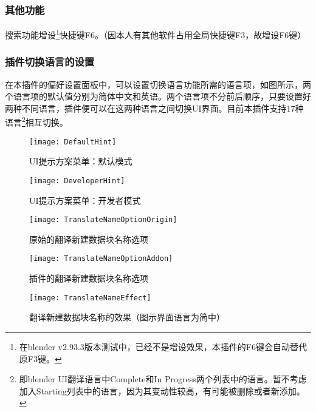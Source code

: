 \documentclass{../../PublicResources/DocClass}
\begin{document}
\subsubsection{其他功能}
搜索功能增设\footnote{在blender v2.93.3版本测试中，已经不是增设效果，本插件的F6键会自动替代原F3键。}快捷键F6。（因本人有其他软件占用全局快捷键F3，故增设F6键）

\subsubsection{插件切换语言的设置}
在本插件的偏好设置面板中，可以设置切换语言功能所需的语言项，如图所示，两个语言项的默认值分别为简体中文和英语。两个语言项不分前后顺序，只要设置好两种不同语言，插件便可以在这两种语言之间切换UI界面。目前本插件支持17种语言\footnote{即blender UI翻译语言中Complete和In Progress两个列表中的语言。暂不考虑加入Starting列表中的语言，因为其变动性较高，有可能被删除或者新添加。}相互切换。

\begin{figure}[h!]
    \begin{minipage}[t]{0.47\textwidth}
        \texttt{[image: DefaultHint]}
        \caption{UI提示方案菜单：默认模式}
        \label{默认提示方案}
    \end{minipage}
    \quad
    \begin{minipage}[t]{0.47\textwidth}
        \texttt{[image: DeveloperHint]}
        \caption{UI提示方案菜单：开发者模式}
        \label{开发者提示方案}
    \end{minipage}

    \vspace{1ex}

    \begin{minipage}[t]{0.47\textwidth}
        \texttt{[image: TranslateNameOptionOrigin]}
        \caption{原始的翻译新建数据块名称选项}
        \label{原始的翻译名称选项}
    \end{minipage}
    \quad
    \begin{minipage}[t]{0.47\textwidth}
        \texttt{[image: TranslateNameOptionAddon]}
        \caption{插件的翻译新建数据块名称选项}
        \label{插件的翻译名称选项}
    \end{minipage}

    \vspace{1ex}

    \texttt{[image: TranslateNameEffect]}
    \caption{翻译新建数据块名称的效果（图示界面语言为简中）}
    \label{翻译名称的效果}
\end{figure}
\end{document}
